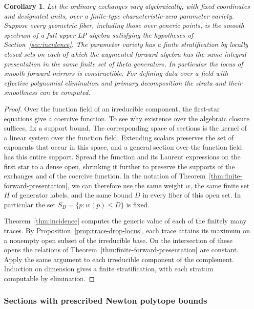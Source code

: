 \documentclass[11pt,reqno]{amsart}
\numberwithin{equation}{section}
\newtheorem{corollary}[theorem]{Corollary}
\theoremstyle{definition}
\theoremstyle{remark}
\begin{document}
\begin{corollary}\label{cor:forward-smoothness-strata}
Let the ordinary exchanges vary algebraically, with fixed coordinates
and designated units, over a finite-type characteristic-zero
parameter variety. Suppose every geometric fiber, including those
over generic points, is the smooth spectrum of a full upper LP algebra
satisfying the hypotheses of
Section~\ref{sec:incidence}.
The parameter variety has a finite stratification by locally closed
sets on each of which the augmented forward algebra has the same
integral presentation in the same finite set of theta generators.
In particular the locus of smooth forward mirrors is constructible.
For defining data over a field with effective polynomial elimination
and primary decomposition the strata and their smoothness can be
computed.
\end{corollary}
\begin{proof}
Over the function field of an irreducible component, the first-star
equations give a coercive function. To see why existence over the
algebraic closure suffices, fix a support bound. The corresponding
space of sections is the kernel of a linear system over the function
field. Extending scalars preserves the set of exponents that occur in
this space, and a general section over the function field has this
entire support. Spread the function and its
Laurent expressions on the first star to a dense open, shrinking it further to preserve the supports of the exchanges and of the coercive
function. In the notation of Theorem~\ref{thm:finite-forward-presentation},
we can therefore use the same weight \(w\), the same finite set \(H\) of
generator labels, and the same bound \(D\) in every fiber of this open
set. In particular the set \(S_D=\{p:w(p)\le D\}\) is fixed.

Theorem~\ref{thm:incidence} computes the generic value of each of
the finitely many traces. By Proposition~\ref{prop:trace-drop-locus},
each trace attains its maximum on a nonempty open subset of the
irreducible base. On the intersection of these opens the relations of
Theorem~\ref{thm:finite-forward-presentation} are constant. Apply the
same argument to each irreducible component of the complement.
Induction on dimension gives a finite stratification, with each
stratum computable by elimination.
\end{proof}

\subsubsection{Sections with prescribed Newton polytope bounds}
\end{document}
